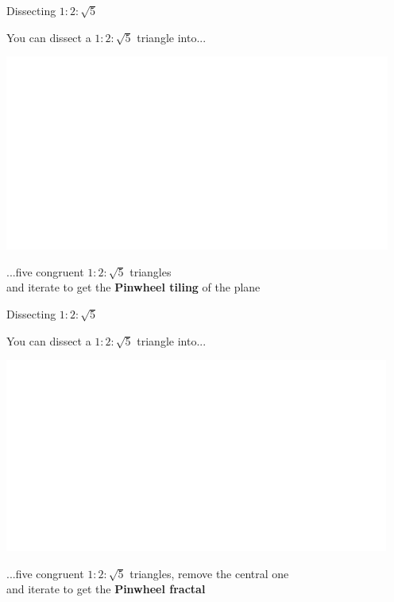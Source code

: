 \documentclass[14pt]{beamer}
\begin{document}
    \begin{frame}{Dissecting $1\!\!:\!\!2\!\!:\!\!\sqrt{5}$}
        \begin{center}
            You can dissect a $1\!\!:\!\!2\!\!:\!\!\sqrt{5}$ triangle into...

            \bigskip \bigskip

            \includegraphics[height=18ex]{figures/figure006g.pdf}

            \bigskip \bigskip

            ...five congruent $1\!\!:\!\!2\!\!:\!\!\sqrt{5}$ triangles\\and iterate to get the \textbf{Pinwheel tiling} of the plane
        \end{center}
    \end{frame}


    \begin{frame}{Dissecting $1\!\!:\!\!2\!\!:\!\!\sqrt{5}$}
        \begin{center}
            You can dissect a $1\!\!:\!\!2\!\!:\!\!\sqrt{5}$ triangle into...

            \bigskip \bigskip

            \includegraphics[height=18ex]{figures/figure006h.pdf}

            \bigskip \bigskip

            ...five congruent $1\!\!:\!\!2\!\!:\!\!\sqrt{5}$ triangles, remove the central one\\and iterate to get the \textbf{Pinwheel fractal}
        \end{center}
    \end{frame}

\end{document}
